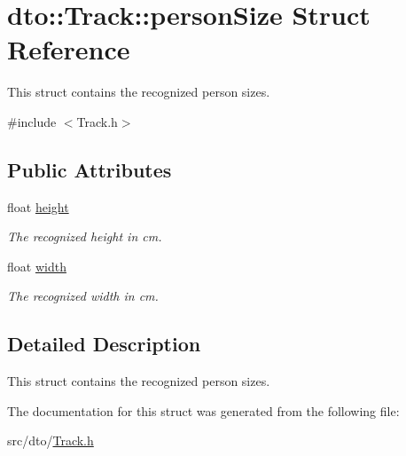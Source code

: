\hypertarget{structdto_1_1_track_1_1person_size}{}\section{dto\+:\+:Track\+:\+:person\+Size Struct Reference}
\label{structdto_1_1_track_1_1person_size}


This struct contains the recognized person sizes.  




{\ttfamily \#include $<$Track.\+h$>$}

\subsection*{Public Attributes}
\begin{DoxyCompactItemize}
\item 
\mbox{\label{structdto_1_1_track_1_1person_size_adf0d5891e4e6b19a53d83a197048ec45}} 
float \mbox{\hyperlink{structdto_1_1_track_1_1person_size_adf0d5891e4e6b19a53d83a197048ec45}{height}}
\begin{DoxyCompactList}\small\item\em The recognized height in cm. \end{DoxyCompactList}\item 
\mbox{\label{structdto_1_1_track_1_1person_size_a8bd430cf5f4d632cbd4f1d9de03ec26d}} 
float \mbox{\hyperlink{structdto_1_1_track_1_1person_size_a8bd430cf5f4d632cbd4f1d9de03ec26d}{width}}
\begin{DoxyCompactList}\small\item\em The recognized width in cm. \end{DoxyCompactList}\end{DoxyCompactItemize}


\subsection{Detailed Description}
This struct contains the recognized person sizes. 

The documentation for this struct was generated from the following file\+:\begin{DoxyCompactItemize}
\item 
src/dto/\mbox{\hyperlink{_track_8h}{Track.\+h}}\end{DoxyCompactItemize}
